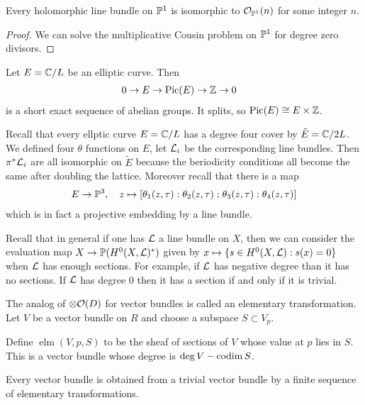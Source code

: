 \documentclass[12pt]{article}
\begin{document}
\begin{proposition}
    Every holomorphic line bundle on $\P^1$ is isomorphic to $\mathcal{O}_{\P^1}(n)$ for some integer $n$.
\end{proposition}

\begin{proof}
    We can solve the multiplicative Cousin problem on $\P^1$ for degree zero divisors.
\end{proof}

\begin{proposition}
    Let $E = \C/L$ be an elliptic curve. Then \begin{align*}
        0 \to E & \to \Pic(E) \to \Z \to 0 
    \end{align*}
    is a short exact sequence of abelian groups. It splits, so $\Pic(E) \cong E \times \Z$.
\end{proposition}

\begin{example}
     Recall that every ellptic curve $E = \C/L$ has a degree four cover by $\tilde E = \C/2L$. We defined four $\theta$ functions on $E$, let $\cL_i$ be the corresponding line bundles. Then $\pi^*\cL_i$ are all isomorphic on $\tilde E$ because the beriodicity conditions all become the same after doubling the lattice. Moreover recall that there is a map \begin{align*}
        E \to \P^3, \quad z \mapsto [\theta_1(z,\tau):\theta_2(z,\tau):\theta_3(z,\tau):\theta_4(z,\tau)]
    \end{align*} which is in fact a projective embedding by a line bundle.
\end{example}
Recall that in general if one has $\cL$ a line bundle on $X$, then we can consider the evaluation map $X \to \P(H^0(X,\cL)^*)$ given by $x \mapsto \{s \in H^0(X,\cL) : s(x)=0\}$ when $\cL$ has enough sections. For example, if $\cL$ has negative degree than it has no sections. If $\cL$ has degree $0$ then it has a section if and only if it is trivial. 

The analog of $\otimes \cO(D)$ for vector bundles is called an elementary transformation. Let $V$ be a vector bundle on $R$ and choose a subspace $S\subset V_p$. 

Define $\operatorname{elm}(V,p,S)$ to be the sheaf of sections of $V$ whose value at $p$ lies in $S$. This is a vector bundle whose degree is $\deg V - \codim S$.

\begin{proposition}
    Every vector bundle is obtained from a trivial vector bundle by a finite sequence of elementary transformations. 
\end{proposition}
\end{document}
